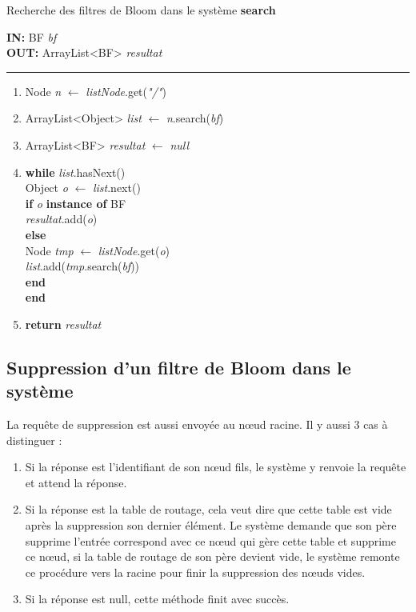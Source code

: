 \documentclass[a4paper,11pt]{report}
\begin{document}
\begin{algorithme}
	Recherche des filtres de Bloom dans le système \textbf{search}
\end{algorithme}

\begin{flushleft}
	\begin{framed}
		\textbf{IN:} BF \textit{bf} \\
		\textbf{OUT:} ArrayList<BF> \textit{resultat}\\
		\noindent\rule{\linewidth}{0.5pt}

		\begin{enumerate}
			\item Node \textit{n} $\leftarrow$ \textit{listNode}.get(\textit{"/"})
			\item ArrayList<Object> \textit{list} $\leftarrow$ \textit{n}.search(\textit{bf})
			\item ArrayList<BF> \textit{resultat} $\leftarrow$ \textit{null}
			\item
				\begin{tabbing}
					\textbf{wh}\=\textbf{ile }\=\textit{list}.hasNext()\\
						\> Object \textit{o} $\leftarrow$ \textit{list}.next()\\
						\> \textbf{if }\= \textit{o} \textbf{instance of} BF\\
						\> \> \textit{resultat}.add(\textit{o})\\
						\> \textbf{else}\\
						\> \> Node \textit{tmp} $\leftarrow$ \textit{listNode}.get(\textit{o})\\
						\> \> \textit{list}.add(\textit{tmp}.search(\textit{bf}))\\
						\> \textbf{end}\\
					\textbf{end}
				\end{tabbing}
			\item \textbf{return} \textit{resultat}									
		\end{enumerate}	
	\end{framed}
\end{flushleft}


\subsection{Suppression d'un filtre de Bloom dans le système}
	La requête de suppression est aussi envoyée au nœud racine. Il y aussi 3 cas à distinguer :
	\begin{enumerate}
		\item Si la réponse est l'identifiant de son nœud fils, le système y renvoie la requête et attend la réponse.
		\item Si la réponse est la table de routage, cela veut dire que cette table est vide après la suppression son dernier élément. Le système demande que son père supprime l'entrée correspond avec ce nœud qui gère cette table et supprime ce nœud, si la table de routage de son père devient vide, le système remonte ce procédure vers la racine pour finir la suppression des nœuds vides.
		\item Si la réponse est null, cette méthode finit avec succès.
	\end{enumerate}
\end{document}
